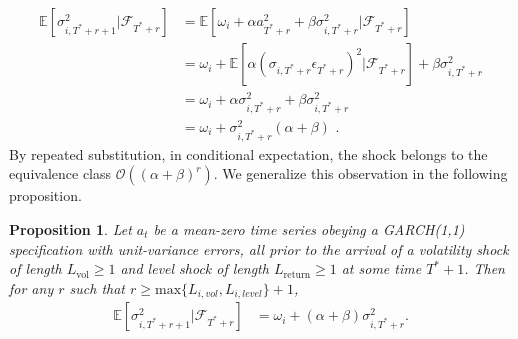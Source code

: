 \documentclass[11pt,3p,review,authoryear]{elsarticle}
\newtheorem{prop}{Proposition}
\theoremstyle{definition}
\begin{document}
\begin{align*}
\mathbb{E}[ \sigma^{2}_{i,T^{*}+r+1} |\mathcal{F}_{T^{*}+r}] & = \mathbb{E}[\omega_{i} + \alpha a_{T^{*}+r}^{2} + \beta\sigma^{2}_{i,T^{*}+r} |\mathcal{F}_{T^{*}+r}] \\
& = \omega_{i} + \mathbb{E}[\alpha(\sigma_{i,T^{*}+r}\epsilon_{T^{*}+r})^{2} |\mathcal{F}_{T^{*}+r}] + \beta\sigma^{2}_{i,T^{*}+r} \\
& = \omega_{i} + \alpha\sigma_{i,T^{*}+r}^{2} + \beta\sigma^{2}_{i,T^{*}+r} \tag{Due to the unit variance assumption}\\
& = \omega_{i} + \sigma^{2}_{i,T^{*}+r}(\alpha + \beta) \text{ .} 
\end{align*}
By repeated substitution, in conditional expectation, the shock belongs to the equivalence class $\mathcal{O}((\alpha+\beta)^{r})$.  We generalize this observation in the following proposition.

\begin{prop}\label{decay_prop}
Let $a_{t}$ be a mean-zero time series obeying a GARCH(1,1) specification with unit-variance errors, all prior to the arrival of a volatility shock of length $L_{\text{vol}} \geq 1$ and level shock of length $L_{\text{return}}\geq 1$ at some time $T^{*}+1$.  Then for any $r$ such that $r \geq \text{max}\{L_{i, vol},L_{i, level}\} + 1$, 
\begin{align*}
\mathbb{E}[ \sigma^{2}_{i,T^{*}+r+1} |\mathcal{F}_{T^{*}+r}] & = \omega_{i} + (\alpha + \beta)\sigma^{2}_{i,T^{*}+r}.
\end{align*}
\end{prop}
\end{document}
